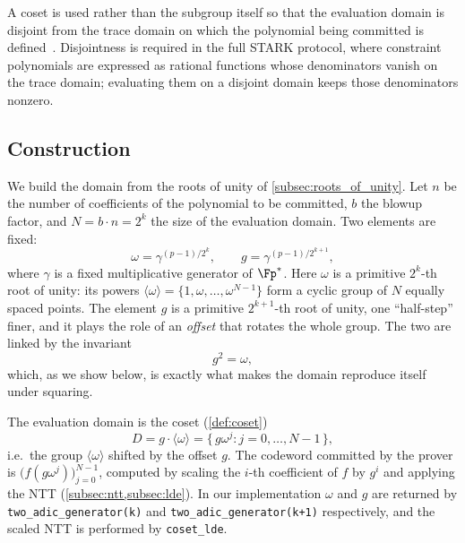A coset is used rather than the subgroup itself so that the evaluation
domain is disjoint from the trace domain on which the polynomial being
committed is defined~\cite[Section~3.4]{ethSTARK}. Disjointness is
required in the full STARK protocol, where constraint polynomials are
expressed as rational functions whose denominators vanish on the trace
domain; evaluating them on a disjoint domain keeps those denominators
nonzero.
 
 
\subsection{Construction}
\label{subsec:domain_construction}

We build the domain from the roots of unity of \cref{subsec:roots_of_unity}.
Let $n$ be the number of coefficients of the polynomial to be committed,
$b$ the blowup factor, and $N = b \cdot n = 2^k$ the size of the
evaluation domain. Two elements are fixed:
%
\begin{equation}
\label{eq:domain_generators}
\omega = \gamma^{(p-1)/2^{k}}, \qquad
g = \gamma^{(p-1)/2^{k+1}},
\end{equation}
%
where $\gamma$ is a fixed multiplicative generator of $\Fp^*$. Here
$\omega$ is a primitive $2^k$-th root of unity: its powers
$\langle\omega\rangle = \{1, \omega, \ldots, \omega^{N-1}\}$ form a
cyclic group of $N$ equally spaced points. The element $g$ is a
primitive $2^{k+1}$-th root of unity, one ``half-step'' finer, and it
plays the role of an \emph{offset} that rotates the whole group. The
two are linked by the invariant
%
\begin{equation}
\label{eq:g_squared}
g^2 = \omega,
\end{equation}
%
which, as we show below, is exactly what makes the domain reproduce
itself under squaring.

The evaluation domain is the coset (\cref{def:coset})
%
\begin{equation}
\label{eq:domain}
D = g \cdot \langle \omega \rangle
  = \{\, g\omega^j : j = 0, \ldots, N-1 \,\},
\end{equation}
%
i.e.\ the group $\langle\omega\rangle$ shifted by the offset $g$. The
codeword committed by the prover is $\bigl(f(g\omega^j)\bigr)_{j=0}^{N-1}$,
computed by scaling the $i$-th coefficient of $f$ by $g^i$ and applying
the NTT (\cref{subsec:ntt,subsec:lde}). In our implementation $\omega$
and $g$ are returned by \texttt{two\_adic\_generator(k)} and
\texttt{two\_adic\_generator(k+1)} respectively, and the scaled NTT is
performed by \texttt{coset\_lde}.

